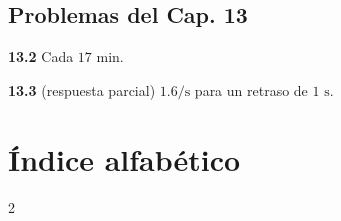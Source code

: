 \documentclass[12pt,a4paper]{book}
\begin{document}
\section*{Problemas del Cap. 13}

\noindent \textbf{13.2} Cada $17\text{ min}$.

\noindent \textbf{13.3} (respuesta parcial) $1.6/\text{s}$ para un retraso de $1\text{ s}$.

\chapter*{Índice alfabético}

\begin{multicols}{2}
\begin{itemize}[leftmargin=*]



\end{itemize}
\end{multicols}
\end{document}
